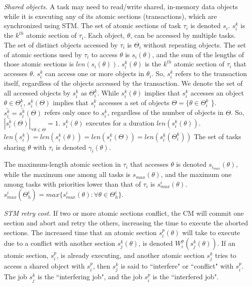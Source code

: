 \documentclass[letter]{sig-alternate}
\begin{document}
\textit{Shared objects.}
 A task may need to read/write shared, in-memory data objects while it is executing any of its atomic sections (transactions), which are synchronized using STM. 
The set of atomic sections of task $\tau_i$ is denoted $s_i$. $s_i^k$ is the $k^{th}$ atomic section of $\tau_i$. 
Each object, $\theta$, can be accessed by multiple tasks. The set of distinct objects accessed by $\tau_i$ is $\Theta_i$ without repeating objects.
The set of atomic sections used by $\tau_i$ to access $\theta$ is $s_i(\theta)$, and the sum of the lengths of those atomic sections is $len(s_i(\theta))$. $s_i^k(\theta)$ is the $k^{th}$ atomic section of $\tau_i$ that accesses $\theta$.
%
 $s_i^k$ can access one or more objects in $\theta_i$. So, $s_i^k$ refers to the transaction itself, regardless of the objects accessed by the transaction. We denote the set of all accessed objects by $s_i^k$ as $\Theta_i^k$. While $s_i^k(\theta)$ implies that $s_i^k$ accesses an object $\theta \in \Theta_i^k$, $s_i^k(\Theta)$ implies that $s_i^k$ accesses a set of objects $\Theta=\{\theta \in \Theta_i^k$ \}. $\bar{s_i^k}=\bar{s_i^k}(\Theta)$ refers only once to $s_i^k$, regardless of the number of objects in $\Theta$. So, $|\bar{s_i^k}(\Theta)|_{\forall \theta \in \Theta}=1$.
%
 $s_i^k(\theta)$  executes for a duration $len(s_i^k(\theta))$. $len(s_i^k)=len(s_i^k(\theta))=len(s_i^k(\Theta))=len(s_i^k(\Theta_i^k))$ The set of tasks sharing $\theta$ with $\tau_i$ is denoted $\gamma_i(\theta)$. 

The maximum-length atomic section in $\tau_i$ that accesses $\theta$ is denoted $s_{i_{max}} (\theta)$, while the maximum one among all tasks is $s_{max} (\theta)$, and the maximum one among tasks with priorities lower than that of $\tau_i$ is $s_{max}^i (\theta)$. $s_{max}^i(\Theta_h^i)=max\{s_{max}^i(\theta):\forall \theta \in \Theta_h^i\}$.

\textit{STM retry cost.} If two or more atomic sections conflict, the CM will commit one section and abort and retry the others, increasing the time to execute the aborted sections. The increased time that an atomic section $s_i^p (\theta)$ will take to execute due to a conflict with another section $s_j^k (\theta)$, is denoted $W_{i}^{p}(s_{j}^{k}(\theta))$. If an atomic section, $s_i^p$, is already executing, and another atomic section $s_j^k$ tries to access a shared object with $s_i^p$, then $s_j^k$ is said to ``interfere" or ``conflict" with $s_i^p$. The job $s_j^k$ is the ``interfering job", and the job $s_i^p$ is the ``interfered job".
\end{document}
